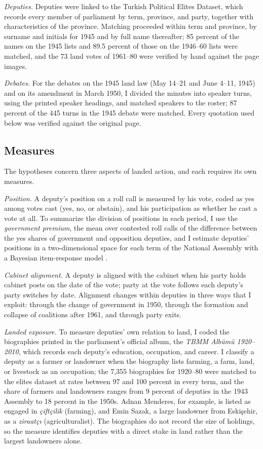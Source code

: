 \documentclass[12pt]{article}
\begin{document}
\textit{Deputies.} Deputies were linked to the Turkish Political Elites Dataset, which records every member of parliament by term, province, and party, together with characteristics of the province. Matching proceeded within term and province, by surname and initials for 1945 and by full name thereafter; 85 percent of the names on the 1945 lists and 89.5 percent of those on the 1946--60 lists were matched, and the 73 land votes of 1961--80 were verified by hand against the page images.

\textit{Debates.} For the debates on the 1945 land law (May 14--21 and June 4--11, 1945) and on its amendment in March 1950, I divided the minutes into speaker turns, using the printed speaker headings, and matched speakers to the roster; 87 percent of the 445 turns in the 1945 debate were matched. Every quotation used below was verified against the original page.

\subsection*{Measures}

The hypotheses concern three aspects of landed action, and each requires its own measures.

\textit{Position.} A deputy's position on a roll call is measured by his vote, coded as yes among votes cast (yes, no, or abstain), and his participation as whether he cast a vote at all. To summarize the division of positions in each period, I use the \textit{government premium}, the mean over contested roll calls of the difference between the yes shares of government and opposition deputies, and I estimate deputies' positions in a two-dimensional space for each term of the National Assembly with a Bayesian item-response model \citep{poole1997,clinton2004}.

\textit{Cabinet alignment.} A deputy is aligned with the cabinet when his party holds cabinet posts on the date of the vote; party at the vote follows each deputy's party switches by date. Alignment changes within deputies in three ways that I exploit: through the change of government in 1950, through the formation and collapse of coalitions after 1961, and through party exits.

\textit{Landed exposure.} To measure deputies' own relation to land, I coded the biographies printed in the parliament's official album, the \textit{TBMM Albümü 1920--2010}, which records each deputy's education, occupation, and career. I classify a deputy as a farmer or landowner when the biography lists farming, a farm, land, or livestock as an occupation; the 7,355 biographies for 1920--80 were matched to the elites dataset at rates between 97 and 100 percent in every term, and the share of farmers and landowners ranges from 9 percent of deputies in the 1943 Assembly to 18 percent in the 1950s. Adnan Menderes, for example, is listed as engaged in \textit{çiftçilik} (farming), and Emin Sazak, a large landowner from Eskişehir, as a \textit{ziraatçı} (agriculturalist). The biographies do not record the size of holdings, so the measure identifies deputies with a direct stake in land rather than the largest landowners alone.
\end{document}
